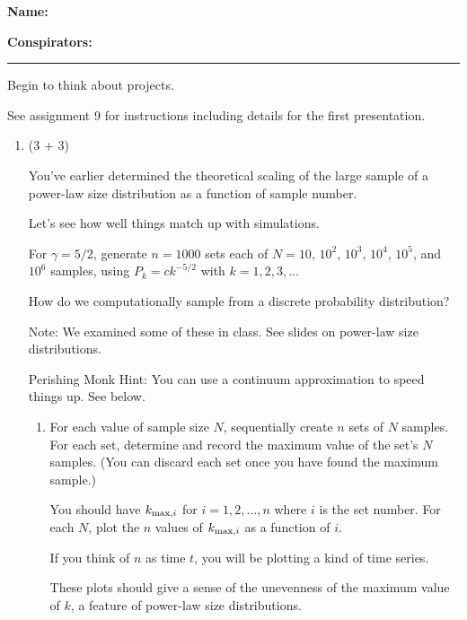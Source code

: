 \textbf{Name:} \\

\medskip

\textbf{Conspirators:} 

\medskip
\medskip

\hrule

\medskip


Begin to think about projects.

See assignment 9 for instructions including details for the first presentation.

\begin{enumerate}

\item (3 + 3)

  You've earlier determined the theoretical scaling
  of the large sample of
  a power-law size distribution
  as a function of sample number.

  Let's see how well things match up with simulations.

  For $\gamma = 5/2$, generate $n=1000$ sets each of 
  $N=10$, $10^{2}$, $10^{3}$, $10^{4}$, $10^{5}$, and $10^{6}$ samples,
  using $P_k = c k^{-5/2}$ with $k=1, 2, 3, \ldots$ 

  How do we computationally sample from a discrete probability
  distribution?

  Note: We examined some of these in class.
  See slides on power-law size distributions.

  Perishing Monk Hint: You can use a continuum approximation to speed things up.
  See below.


  \begin{enumerate}
  \item 
    For each value of sample size $N$, sequentially create $n$ sets of $N$ samples.
    For each set,
    determine and record the maximum value of the set's $N$ samples.
    (You can discard each set once you have found the maximum sample.)

    You should have $k_{\textnormal{max},i}$ for $i=1, 2, \ldots, n$ where $i$
    is the set number.
    For each $N$, plot the $n$ values of $k_{\textnormal{max},i}$ as a function of $i$.

    If you think of $n$ as time $t$, you will be plotting a kind of time series.

    These plots should give a sense
    of the unevenness of the maximum value of $k$, 
    a feature of power-law size distributions.
    

\end{enumerate}
\end{enumerate}
